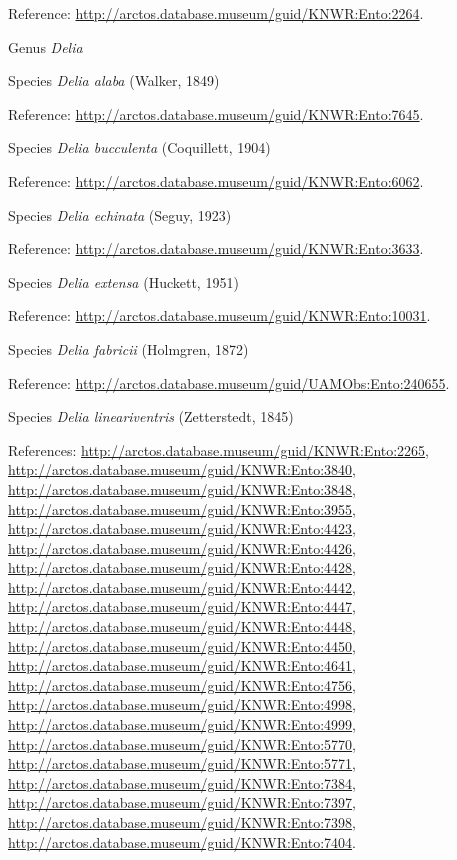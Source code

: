 \documentclass[9pt, article]{memoir}
\begin{document}
\begin{multicols}{2}
Reference: 
\url{http://arctos.database.museum/guid/KNWR:Ento:2264}.

\vspace{6pt}\noindent\hspace{30pt}Genus \textit{Delia}


\vspace{6pt}\noindent\hspace{36pt}Species \textit{Delia alaba} (Walker, 1849)


Reference: 
\url{http://arctos.database.museum/guid/KNWR:Ento:7645}.

\vspace{6pt}\noindent\hspace{36pt}Species \textit{Delia bucculenta} (Coquillett, 1904)


Reference: 
\url{http://arctos.database.museum/guid/KNWR:Ento:6062}.

\vspace{6pt}\noindent\hspace{36pt}Species \textit{Delia echinata} (Seguy, 1923)


Reference: 
\url{http://arctos.database.museum/guid/KNWR:Ento:3633}.

\vspace{6pt}\noindent\hspace{36pt}Species \textit{Delia extensa} (Huckett, 1951)


Reference: 
\url{http://arctos.database.museum/guid/KNWR:Ento:10031}.

\vspace{6pt}\noindent\hspace{36pt}Species \textit{Delia fabricii} (Holmgren, 1872)


Reference: 
\url{http://arctos.database.museum/guid/UAMObs:Ento:240655}.

\vspace{6pt}\noindent\hspace{36pt}Species \textit{Delia lineariventris} (Zetterstedt, 1845)


References: 
\url{http://arctos.database.museum/guid/KNWR:Ento:2265}, 
\url{http://arctos.database.museum/guid/KNWR:Ento:3840}, 
\url{http://arctos.database.museum/guid/KNWR:Ento:3848}, 
\url{http://arctos.database.museum/guid/KNWR:Ento:3955}, 
\url{http://arctos.database.museum/guid/KNWR:Ento:4423}, 
\url{http://arctos.database.museum/guid/KNWR:Ento:4426}, 
\url{http://arctos.database.museum/guid/KNWR:Ento:4428}, 
\url{http://arctos.database.museum/guid/KNWR:Ento:4442}, 
\url{http://arctos.database.museum/guid/KNWR:Ento:4447}, 
\url{http://arctos.database.museum/guid/KNWR:Ento:4448}, 
\url{http://arctos.database.museum/guid/KNWR:Ento:4450}, 
\url{http://arctos.database.museum/guid/KNWR:Ento:4641}, 
\url{http://arctos.database.museum/guid/KNWR:Ento:4756}, 
\url{http://arctos.database.museum/guid/KNWR:Ento:4998}, 
\url{http://arctos.database.museum/guid/KNWR:Ento:4999}, 
\url{http://arctos.database.museum/guid/KNWR:Ento:5770}, 
\url{http://arctos.database.museum/guid/KNWR:Ento:5771}, 
\url{http://arctos.database.museum/guid/KNWR:Ento:7384}, 
\url{http://arctos.database.museum/guid/KNWR:Ento:7397}, 
\url{http://arctos.database.museum/guid/KNWR:Ento:7398}, 
\url{http://arctos.database.museum/guid/KNWR:Ento:7404}.


\end{multicols}
\end{document}
